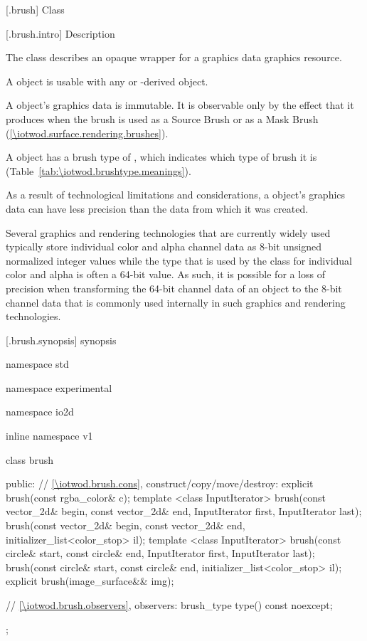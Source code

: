  [\iotwod.brush] {Class }

 [\iotwod.brush.intro] { Description}

\pnum
{}
The class  describes an opaque wrapper for a graphics data graphics resource.

\pnum
A  object is usable with any  or -derived object.

\pnum
A  object's graphics data is immutable. It is observable only by the effect that it produces when the brush is used as a Source Brush or as a Mask Brush (\ref{\iotwod.surface.rendering.brushes}).

\pnum
A  object has a brush type of , which indicates which type of brush it is (Table~\ref{tab:\iotwod.brushtype.meanings}).

\pnum
As a result of technological limitations and considerations, a  object's graphics data can have less precision than the data from which it was created.

\pnum
\begin{example}
Several graphics and rendering technologies that are currently widely used typically store individual color and alpha channel data as 8-bit unsigned normalized integer values while the  type that is used by the  class for individual color and alpha is often a 64-bit value. As such, it is possible for a loss of precision when transforming the 64-bit channel data of an  object to the 8-bit channel data that is commonly used internally in such graphics and rendering technologies.
\end{example}

 [\iotwod.brush.synopsis] { synopsis}

\begin{codeblock}
namespace std { namespace experimental { namespace io2d { inline namespace v1 {
  class brush {
  public:
    // \ref{\iotwod.brush.cons}, construct/copy/move/destroy:
    explicit brush(const rgba_color& c);
    template <class InputIterator>
    brush(const vector_2d& begin, const vector_2d& end,
      InputIterator first, InputIterator last);
    brush(const vector_2d& begin, const vector_2d& end,
      initializer_list<color_stop> il);
    template <class InputIterator>
    brush(const circle& start, const circle& end,
      InputIterator first, InputIterator last);
    brush(const circle& start, const circle& end,
      initializer_list<color_stop> il);
    explicit brush(image_surface&& img);

    // \ref{\iotwod.brush.observers}, observers:
    brush_type type() const noexcept;
  };
} } } }
\end{codeblock}


